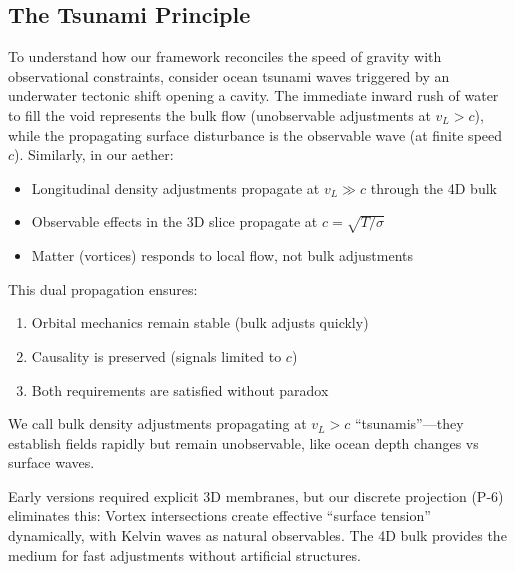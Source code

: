 \medskip

\subsection{The Tsunami Principle}

To understand how our framework reconciles the speed of gravity with observational constraints, consider ocean tsunami waves triggered by an underwater tectonic shift opening a cavity. The immediate inward rush of water to fill the void represents the bulk flow (unobservable adjustments at $v_L > c$), while the propagating surface disturbance is the observable wave (at finite speed $c$). Similarly, in our aether:
\begin{itemize}
\item Longitudinal density adjustments propagate at $v_L \gg c$ through the 4D bulk
\item Observable effects in the 3D slice propagate at $c = \sqrt{T / \sigma}$
\item Matter (vortices) responds to local flow, not bulk adjustments
\end{itemize}

This dual propagation ensures:
\begin{enumerate}
\item Orbital mechanics remain stable (bulk adjusts quickly)
\item Causality is preserved (signals limited to $c$)
\item Both requirements are satisfied without paradox
\end{enumerate}

We call bulk density adjustments propagating at $v_L > c$ ``tsunamis''---they establish fields rapidly but remain unobservable, like ocean depth changes vs surface waves.

\begin{tcolorbox}[title=Why Two Speeds Without Membranes]
Early versions required explicit 3D membranes, but our discrete projection (P-6) eliminates this: Vortex intersections create effective ``surface tension'' dynamically, with Kelvin waves as natural observables. The 4D bulk provides the medium for fast adjustments without artificial structures.
\end{tcolorbox}

